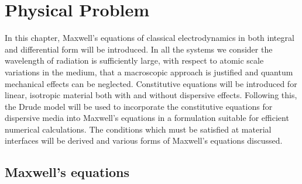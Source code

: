 \chapter{Physical Problem} %
\label{PhysicalProblemChapter}

%

In this chapter, Maxwell's equations of classical electrodynamics in both integral and differential form will be introduced. In all the systems we consider the wavelength of radiation is sufficiently large, with respect to atomic scale variations in the medium, that a macroscopic approach is justified and quantum mechanical effects can be neglected. Constitutive equations will be introduced for linear, isotropic material both with and without dispersive effects. Following this, the Drude model will be used to incorporate the constitutive equations for dispersive media into Maxwell's equations in a formulation suitable for efficient numerical calculations. The conditions which must be satisfied at material interfaces will be derived and various forms of Maxwell's equations discussed.

\section{Maxwell's equations}


